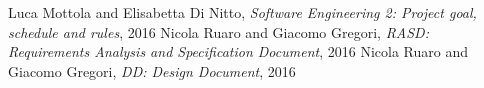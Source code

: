 	Luca Mottola and Elisabetta Di Nitto, \emph{Software Engineering 2: Project goal, schedule and rules}, 2016
	Nicola Ruaro and Giacomo Gregori, \emph{RASD: Requirements Analysis and Specification Document}, 2016	
	Nicola Ruaro and Giacomo Gregori, \emph{DD: Design Document}, 2016	